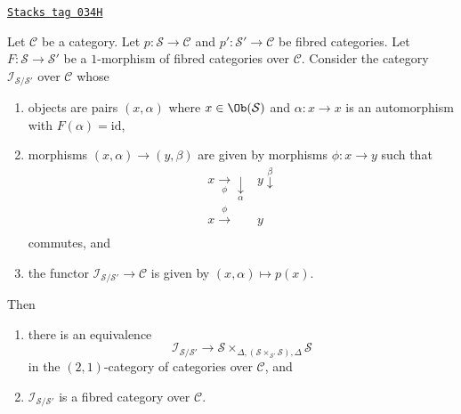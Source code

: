 \begin{lemma}
\label{categories-lemma-inertia-fibred-category}
\href{https://stacks.math.columbia.edu/tag/034H}{\texttt{Stacks tag 034H}}

Let $\mathcal{C}$ be a category. Let
$p : \mathcal{S} \to \mathcal{C}$ and
$p' : \mathcal{S}' \to \mathcal{C}$ be fibred categories.
Let $F : \mathcal{S} \to \mathcal{S}'$ be a $1$-morphism of
fibred categories over $\mathcal{C}$. Consider the category
$\mathcal{I}_{\mathcal{S}/\mathcal{S}'}$ over $\mathcal{C}$ whose
\begin{enumerate}
\item objects are pairs $(x, \alpha)$ where $x \in \Ob(\mathcal{S})$
and $\alpha : x \to x$ is an automorphism with $F(\alpha) = \text{id}$,
\item morphisms $(x, \alpha) \to (y, \beta)$ are given by morphisms
$\phi : x \to y$ such that
$$
\begin{array}{cc}x\underset{\phi}{\longrightarrow}\underset{\alpha}{\downarrow} & y\overset{\beta}{\downarrow} \\ x\overset{\phi}{\longrightarrow} & y \\  & \end{array}
$$
commutes, and
\item the functor $\mathcal{I}_{\mathcal{S}/\mathcal{S}'} \to \mathcal{C}$
is given by $(x, \alpha) \mapsto p(x)$.
\end{enumerate}
Then
\begin{enumerate}
\item there is an equivalence
$$
\mathcal{I}_{\mathcal{S}/\mathcal{S}'} \longrightarrow
\mathcal{S}
\times_{\Delta, (\mathcal{S} \times_{\mathcal{S}'} \mathcal{S}), \Delta}
\mathcal{S}
$$
in the $(2, 1)$-category of categories over $\mathcal{C}$, and
\item $\mathcal{I}_{\mathcal{S}/\mathcal{S}'}$ is a fibred category over
$\mathcal{C}$.
\end{enumerate}
\end{lemma}

